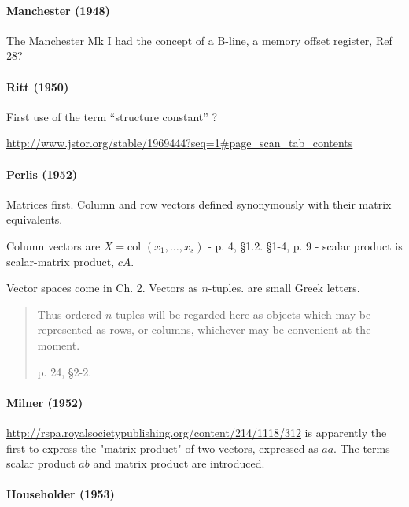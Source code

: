\paragraph{Manchester (1948)}

The Manchester Mk I had the concept of a B-line, a memory offset register, Ref 28?



\paragraph{Ritt (1950)~\cite{Ritt1950}}

First use of the term ``structure constant'' ?

\url{http://www.jstor.org/stable/1969444?seq=1#page_scan_tab_contents}


\paragraph{Perlis (1952)~\cite{Perlis1952}}

Matrices first. Column and row vectors defined synonymously with their matrix equivalents.

Column vectors are $X = \textrm{col }(x_1, \dots, x_s)$ - p. 4, \S 1.2.
\S 1-4, p. 9 - scalar product is scalar-matrix product, $c A$.

Vector spaces come in Ch. 2. Vectors as $n$-tuples. are small Greek letters.

\begin{quote}
Thus ordered $n$-tuples will be regarded here as objects which may be represented as rows, or columns, whichever may be convenient at the moment.

p. 24, \S2-2.
\end{quote}



\paragraph{Milner (1952)}

\url{http://rspa.royalsocietypublishing.org/content/214/1118/312}
is apparently the first to express the "matrix product" of two vectors, expressed as $a \overline{a}$.
The terms scalar product $\overline{a} b$ and matrix product are introduced.



\paragraph{Householder (1953)~\cite{Householder1953}}

